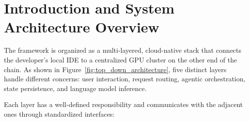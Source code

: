 \section{Introduction and System Architecture Overview}
\label{sec:architecture}

The framework is organized as a multi-layered, cloud-native stack that connects the developer's local IDE to a centralized GPU cluster on the other end of the chain. As shown in Figure~\ref{fig:top_down_architecture}, five distinct layers handle different concerns: user interaction, request routing, agentic orchestration, state persistence, and language model inference.



Each layer has a well-defined responsibility and communicates with the adjacent ones through standardized interfaces:

